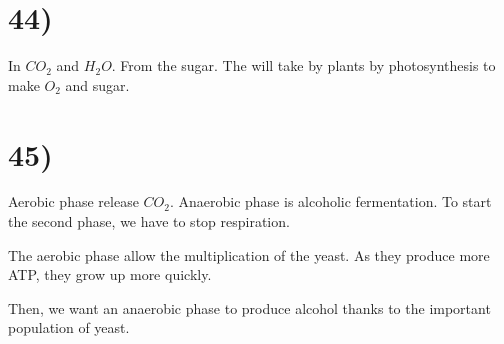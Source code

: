\section*{44)}
In $CO_2$ and $H_2O$. From the sugar. The will take by plants by photosynthesis to make $O_2$ and sugar.

\section*{45)}
Aerobic phase release $CO_2$. Anaerobic phase is alcoholic fermentation. To start the second phase, we have to stop respiration.

The aerobic phase allow the multiplication of the yeast. As they produce more ATP, they grow up more quickly.

Then, we want an anaerobic phase to produce alcohol thanks to the important population of yeast.

